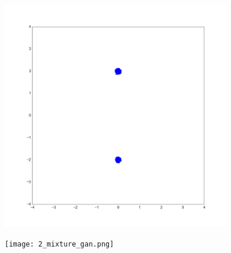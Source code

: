 \documentclass[dvipdfmx,12pt,unicode]{beamer}
\begin{document}
\begin{frame}
  \begin{figure}[htb]
    \begin{center}
      \includegraphics[width=10cm]{2_mixture_true.png}
    \end{center}
  \end{figure}
\end{frame}

\begin{frame}
  \begin{figure}[htb]
    \begin{center}
      \texttt{[image: 2\_mixture\_gan.png]}
    \end{center}
  \end{figure}
  
\end{frame}
\end{document}
